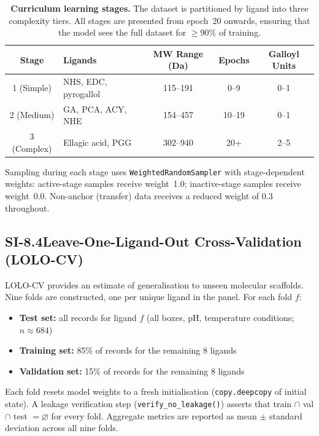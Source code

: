 \documentclass[11pt]{article}
\begin{document}
\begin{table}[H]
\small
\centering
\caption{\textbf{Curriculum learning stages.}
  The dataset is partitioned by ligand into three complexity tiers.
  All stages are presented from epoch~20 onwards, ensuring that the model
  sees the full dataset for $\geq 90\%$ of training.}
\label{tab:si_curriculum}
\begin{tabular}{clccc}
\toprule
\textbf{Stage} & \textbf{Ligands} & \textbf{MW Range (Da)}
  & \textbf{Epochs} & \textbf{Galloyl Units} \\
\midrule
1 (Simple)  & NHS, EDC, pyrogallol           & 115--191 & 0--9   & 0--1 \\
2 (Medium)  & GA, PCA, ACY, NHE              & 154--457 & 10--19 & 0--1 \\
3 (Complex) & Ellagic acid, PGG              & 302--940 & 20+    & 2--5 \\
\bottomrule
\end{tabular}
\end{table}

\noindent
Sampling during each stage uses \texttt{WeightedRandomSampler} with
stage-dependent weights:
active-stage samples receive weight~1.0; inactive-stage samples
receive weight~0.0.
Non-anchor (transfer) data receives a reduced weight of 0.3 throughout.

\subsection*{SI-8.4\quad Leave-One-Ligand-Out Cross-Validation (LOLO-CV)}

LOLO-CV provides an estimate of generalisation to unseen molecular
scaffolds.
Nine folds are constructed, one per unique ligand in the panel.
For each fold $f$:
\begin{itemize}[leftmargin=1.5em]
  \item \textbf{Test set:} all records for ligand $f$
    (all boxes, pH, temperature conditions; $n \approx 684$)
  \item \textbf{Training set:} 85\% of records for the remaining
    8 ligands
  \item \textbf{Validation set:} 15\% of records for the remaining
    8 ligands
\end{itemize}
Each fold resets model weights to a fresh initialisation
(\texttt{copy.deepcopy} of initial state).
A leakage verification step (\texttt{verify\_no\_leakage()}) asserts
that train $\cap$ val $\cap$ test $= \varnothing$ for every fold.
Aggregate metrics are reported as mean $\pm$ standard deviation across
all nine folds.
\end{document}
